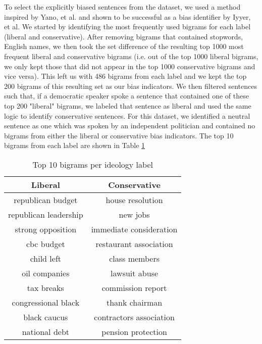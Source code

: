 \documentclass[10pt,a4paper,onecolumn]{article}
\begin{document}
To select the explicitly biased sentences from the dataset, we used a method inspired by Yano, et al. \cite{YanoBigrams} and shown to be successful as a bias identifier by Iyyer, et al. \cite{iyyerRNN} We started by identifying the most frequently used bigrams for each label (liberal and conservative). After removing bigrams that contained stopwords, English names, we then took the set difference of the resulting top 1000 most frequent liberal and conservative bigrams (i.e. out of the top 1000 liberal bigrams, we only kept those that did not appear in the top 1000 conservative bigrams and vice versa). This left us with 486 bigrams from each label and we kept the top 200 bigrams of this resulting set as our bias indicators. We then filtered sentences such that, if a democratic speaker spoke a sentence that contained one of these top 200 "liberal" bigrams, we labeled that sentence as liberal and used the same logic to identify conservative sentences. For this dataset, we identified a neutral sentence as one which was spoken by an independent politician and contained no bigrams from either the liberal or conservative bias indicators. The top 10 bigrams from each label are shown in Table \ref{tab:bigrams}

\begin{table}[h!]
	\begin{center}
		\caption{Top 10 bigrams per ideology label}
		\label{tab:bigrams}
		\begin{tabular}{c|c}
			\hline\hline
			\textbf{Liberal} & \textbf{Conservative}\\
			\hline
			republican budget & house resolution \\
			republican leadership & new jobs \\
			strong opposition & immediate consideration \\
			cbc budget & restaurant association \\
			child left & class members \\
			oil companies & lawsuit abuse \\
			tax breaks & commission report \\
			congressional black & thank chairman \\
			black caucus & contractors association \\
			national debt & pension protection \\
			\hline\hline
		\end{tabular}
	\end{center}
\end{table}
\end{document}
